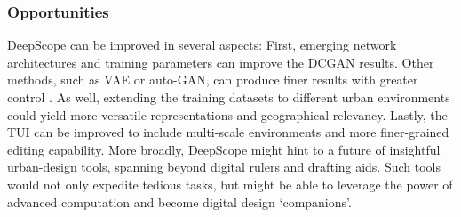 {{        \subsubsection{Opportunities}\label{opportunities}
        {
            DeepScope can be improved in several aspects: First, emerging network architectures and training parameters can improve the DCGAN results. Other methods, such as VAE or auto-GAN, can produce finer results with greater control \cite{mescheder2017adversarial}. As well, extending the training datasets to different urban environments could yield more versatile representations and geographical relevancy. Lastly, the TUI can be improved to include multi-scale environments and more finer-grained editing capability.
            \newline
            More broadly, DeepScope might hint to a future of insightful urban-design tools, spanning beyond digital rulers and drafting aids. Such tools would not only expedite tedious tasks, but might be able to leverage the power of advanced computation and become digital design `companions'.
        }
    }
}
